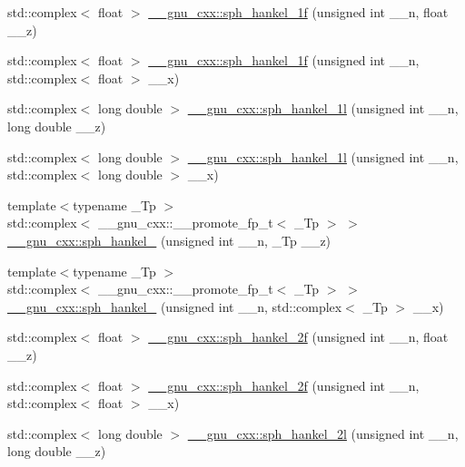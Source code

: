 \begin{DoxyCompactItemize}
\item 
std\+::complex$<$ float $>$ \hyperlink{group__gnu__math__spec__func_ga70d4fc01069f3f0ac0e3b52fe1dffea4}{\+\_\+\+\_\+gnu\+\_\+cxx\+::sph\+\_\+hankel\+\_\+1f} (unsigned int \+\_\+\+\_\+n, float \+\_\+\+\_\+z)
\item 
std\+::complex$<$ float $>$ \hyperlink{group__gnu__math__spec__func_gadbb875cd50abb62ac75386143486bb2c}{\+\_\+\+\_\+gnu\+\_\+cxx\+::sph\+\_\+hankel\+\_\+1f} (unsigned int \+\_\+\+\_\+n, std\+::complex$<$ float $>$ \+\_\+\+\_\+x)
\item 
std\+::complex$<$ long double $>$ \hyperlink{group__gnu__math__spec__func_ga6e77fd5cddfbd57d9120b20fc6c30e6f}{\+\_\+\+\_\+gnu\+\_\+cxx\+::sph\+\_\+hankel\+\_\+1l} (unsigned int \+\_\+\+\_\+n, long double \+\_\+\+\_\+z)
\item 
std\+::complex$<$ long double $>$ \hyperlink{group__gnu__math__spec__func_ga3e9d889d8f2e4792e892b12b1f5948b9}{\+\_\+\+\_\+gnu\+\_\+cxx\+::sph\+\_\+hankel\+\_\+1l} (unsigned int \+\_\+\+\_\+n, std\+::complex$<$ long double $>$ \+\_\+\+\_\+x)
\item 
{\footnotesize template$<$typename \+\_\+\+Tp $>$ }\\std\+::complex$<$ \+\_\+\+\_\+gnu\+\_\+cxx\+::\+\_\+\+\_\+promote\+\_\+fp\+\_\+t$<$ \+\_\+\+Tp $>$ $>$ \hyperlink{group__gnu__math__spec__func_gafb5debe7f7db9e9e456c065acf738f64}{\+\_\+\+\_\+gnu\+\_\+cxx\+::sph\+\_\+hankel\+\_} (unsigned int \+\_\+\+\_\+n, \+\_\+\+Tp \+\_\+\+\_\+z)
\item 
{\footnotesize template$<$typename \+\_\+\+Tp $>$ }\\std\+::complex$<$ \+\_\+\+\_\+gnu\+\_\+cxx\+::\+\_\+\+\_\+promote\+\_\+fp\+\_\+t$<$ \+\_\+\+Tp $>$ $>$ \hyperlink{group__gnu__math__spec__func_ga211067788880febb07e9b49e20db001e}{\+\_\+\+\_\+gnu\+\_\+cxx\+::sph\+\_\+hankel\+\_} (unsigned int \+\_\+\+\_\+n, std\+::complex$<$ \+\_\+\+Tp $>$ \+\_\+\+\_\+x)
\item 
std\+::complex$<$ float $>$ \hyperlink{group__gnu__math__spec__func_ga9496b81f94b8ba0162cf45df72be1e71}{\+\_\+\+\_\+gnu\+\_\+cxx\+::sph\+\_\+hankel\+\_\+2f} (unsigned int \+\_\+\+\_\+n, float \+\_\+\+\_\+z)
\item 
std\+::complex$<$ float $>$ \hyperlink{group__gnu__math__spec__func_ga4c3194b71831b265811f987cbbf6e031}{\+\_\+\+\_\+gnu\+\_\+cxx\+::sph\+\_\+hankel\+\_\+2f} (unsigned int \+\_\+\+\_\+n, std\+::complex$<$ float $>$ \+\_\+\+\_\+x)
\item 
std\+::complex$<$ long double $>$ \hyperlink{group__gnu__math__spec__func_ga6d3ead73a4f0bfeeb0aa1fd99daaf3b1}{\+\_\+\+\_\+gnu\+\_\+cxx\+::sph\+\_\+hankel\+\_\+2l} (unsigned int \+\_\+\+\_\+n, long double \+\_\+\+\_\+z)

\end{DoxyCompactItemize}
